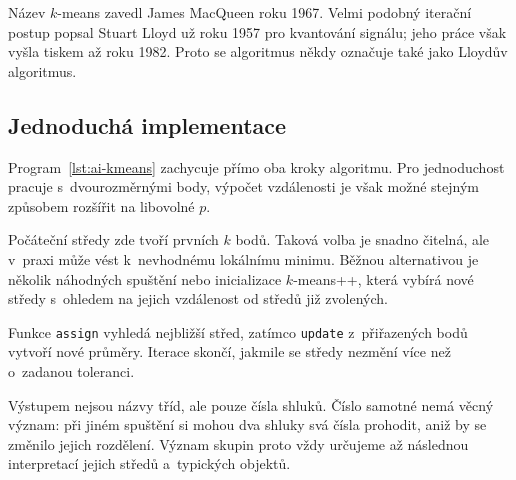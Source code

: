 \begin{remark}
    Název \(k\)-means zavedl James MacQueen roku 1967. Velmi podobný iterační postup popsal Stuart Lloyd už roku 1957 pro kvantování signálu; jeho práce však vyšla tiskem až roku 1982. Proto se algoritmus někdy označuje také jako Lloydův algoritmus.
\end{remark}

\subsection{Jednoduchá implementace}

Program~\ref{lst:ai-kmeans} zachycuje přímo oba kroky algoritmu. Pro jednoduchost pracuje s~dvourozměrnými body, výpočet vzdálenosti je však možné stejným způsobem rozšířit na libovolné \(p\).

Počáteční středy zde tvoří prvních \(k\) bodů. Taková volba je snadno čitelná, ale v~praxi může vést k~nevhodnému lokálnímu minimu. Běžnou alternativou je několik náhodných spuštění nebo inicializace \(k\)-means++, která vybírá nové středy s~ohledem na jejich vzdálenost od středů již zvolených.



Funkce \texttt{assign} vyhledá nejbližší střed, zatímco \texttt{update} z~přiřazených bodů vytvoří nové průměry. Iterace skončí, jakmile se středy nezmění více než o~zadanou toleranci.

Výstupem nejsou názvy tříd, ale pouze čísla shluků. Číslo samotné nemá věcný význam: při jiném spuštění si mohou dva shluky svá čísla prohodit, aniž by se změnilo jejich rozdělení. Význam skupin proto vždy určujeme až následnou interpretací jejich středů a~typických objektů.
